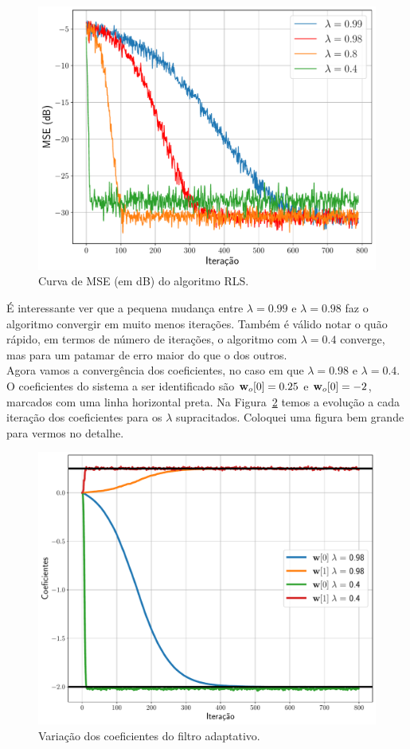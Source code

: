\documentclass{homeworkclass}
\begin{document}
\begin{homeworkProblem}
	\begin{figure}[!ht]
		\centering
		\includegraphics[width=0.75\linewidth]{figs/mse_rls}
		\caption{Curva de MSE (em dB) do algoritmo RLS.}
		\label{fig:mselms}
	\end{figure}
	
	É interessante ver que a pequena mudança entre $\lambda = 0.99$ e $\lambda = 0.98$ faz o algoritmo convergir em muito menos iterações. Também é válido notar o quão rápido, em termos de número de iterações, o algoritmo com $\lambda = 0.4$ converge, mas para um patamar de erro maior do que o dos outros. \\
	
	Agora vamos a convergência dos coeficientes, no caso em que $\lambda = 0.98$ e $\lambda = 0.4$. O coeficientes do sistema a ser identificado são $\mathbf{w}_{o}[0] = 0.25$ e $\mathbf{w}_{o}[0] = -2$, marcados com uma linha horizontal preta. Na Figura~\ref{fig:coef} temos a evolução a cada iteração dos coeficientes para os $\lambda$ supracitados. Coloquei uma figura bem grande para vermos no detalhe. 
	
	\begin{figure}[!ht]
	\centering
	\includegraphics[width=\linewidth]{figs/coeficientes}
	\caption{Variação dos coeficientes do filtro adaptativo.}
	\label{fig:coef}
	\end{figure}
	

\end{homeworkProblem}
\end{document}

